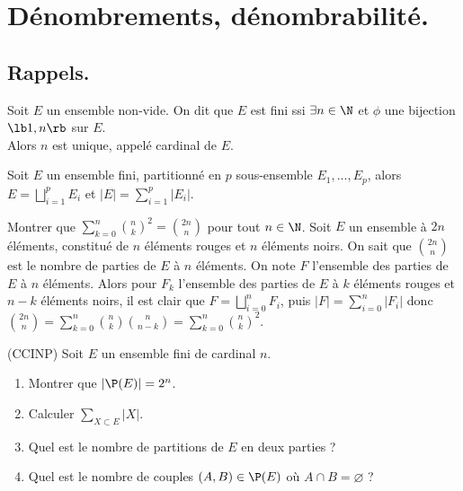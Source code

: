 \documentclass[11pt]{article}
\begin{document}


\vspace*{-0.7cm}

\section{Dénombrements, dénombrabilité.}

\vspace*{-0.4cm}

\subsection{Rappels.}

\begin{defi}{}{}
    Soit $E$ un ensemble non-vide. On dit que $E$ est fini ssi $\exists n \in \N$ et $\phi$ une bijection $\lb 1, n \rb$ sur $E$.\\
    Alors $n$ est unique, appelé cardinal de $E$.
\end{defi}

\vspace*{-0.8cm}

\begin{prop}{}{}
    Soit $E$ un ensemble fini, partitionné en $p$ sous-ensemble $E_1,...,E_p$, alors $E=\bigsqcup_{i=1}^p E_i$ et $|E|=\sum_{i=1}^p|E_i|$.
\end{prop}

\vspace*{-0.8cm}

\begin{exercice}{}{}
    Montrer que $\sum_{k=0}^n\binom{n}{k}^2 = \binom{2n}{n}$ pour tout $n\in\N$.
    \tcblower
    Soit $E$ un ensemble à $2n$ éléments, constitué de $n$ éléments rouges et $n$ éléments noirs. On sait que $\binom{2n}{n}$ est le nombre de parties de $E$ à $n$ éléments. On note $F$ l'ensemble des parties de $E$ à $n$ éléments. Alors pour $F_k$ l'ensemble des parties de $E$ à $k$ éléments rouges et $n-k$ éléments noirs, il est clair que $F=\bigsqcup_{i=0}^n F_i$, puis $|F|=\sum_{i=0}^n|F_i|$ donc $\binom{2n}{n}=\sum_{k=0}^n\binom{n}{k}\binom{n}{n-k}=\sum_{k=0}^n\binom{n}{k}^2$.
\end{exercice}

\vspace*{-0.8cm}

\begin{exercice}{(CCINP)}{}
    Soit $E$ un ensemble fini de cardinal $n$.
    \begin{enumerate}
        \item Montrer que $|\P(E)|=2^n$.
        \item Calculer $\sum_{X\subset E}|X|$.
        \item Quel est le nombre de partitions de $E$ en deux parties ?
        \item Quel est le nombre de couples $(A,B)\in\P(E)$ où $A\cap B = \varnothing$ ?
    \end{enumerate}
\end{exercice}
\end{document}
